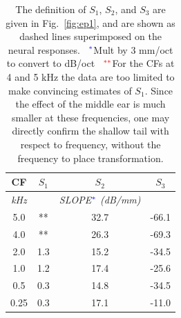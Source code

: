 \documentclass{ws-p8-50x6-00}
\newcommand{\Fig}[1]{Fig.~\ref{fig:#1}}
\newcommand{\blue}{\color{blue}}
\newcommand{\red}{\color{red}}
\begin{document}
\begin{table}[htb]
\begin{minipage}[c]{2in}
        \begin{center}
\begin{tabular}{c|ccc} \hline \hline
CF & $S_1$ & $S_2$ & $S_3$ \\ \hline
{\it kHz} &  & {\it SLOPE$^{\blue *}$ (dB/mm)} & \\ \hline 
5.0 & {\blue **} &   32.7 &  -66.1  \\
4.0 & {\blue **} &   26.3 &  -69.3  \\
2.0 & {\blue  1.3} &   15.2 &  -34.5  \\
1.0 & {\blue  1.2} &   17.4 &  -25.6  \\
0.5 & {\blue  0.3} &   14.8 &  -34.5  \\
0.25 &{\blue  0.3} &   17.1 &  -11.0  \\ \hline
\end{tabular}
        \end{center}
\end{minipage}
\hfill
\begin{minipage}[c]{2in}
\caption{ \small \setlength{\baselineskip}{.1em}
The definition of $S_1$, $S_2$, and $S_3$ are given in
\Fig{ep1}, and are shown as dashed lines superimposed on the neural responses.
{\ $^{\blue *}$Mult by 3 mm/oct to convert to dB/oct}
{\ $^{\red **}$For the CFs at 4 and 5 kHz the data are too limited to make
convincing estimates of $S_1$. Since the effect of the middle ear
is much smaller at these frequencies, one may directly confirm the shallow tail
with respect to frequency, without the frequency to place transformation.}
\label{tab:slopes}
}
\end{minipage}
\end{table}

\begin{figure}[ht]
\begin{minipage}[c]{3.5in}
	\begin{center}
	\end{center}
\end{minipage}
\hfill
{}
\end{figure}
\end{document}
